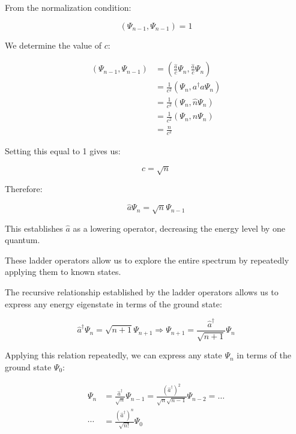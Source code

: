 \documentclass[italian]{HKNdocument}
\begin{document}
From the normalization condition:

\begin{equation*}
(\Psi_{n-1}, \Psi_{n-1}) = 1 \tag{5.32}
\end{equation*}

We determine the value of $c$:

\begin{align*}
(\Psi_{n-1}, \Psi_{n-1}) &= \left(\frac{\hat{a}}{c}\Psi_n, \frac{\hat{a}}{c}\Psi_n\right) \\
&= \frac{1}{c^2}(\Psi_n, a^\dagger a\Psi_n) \\
&= \frac{1}{c^2}(\Psi_n, \hat{n}\Psi_n) \tag{5.33} \\
&= \frac{1}{c^2}(\Psi_n, n\Psi_n) \\
&= \frac{n}{c^2}
\end{align*}

Setting this equal to 1 gives us:

\begin{equation*}
c = \sqrt{n} \tag{5.34}
\end{equation*}

Therefore:

\begin{equation*}
\hat{a}\Psi_n = \sqrt{n}\Psi_{n-1} \tag{5.35}
\end{equation*}

This establishes $\hat{a}$ as a lowering operator, decreasing the energy level by one quantum.

These ladder operators allow us to explore the entire spectrum by repeatedly applying them to known states.


The recursive relationship established by the ladder operators allows us to express any energy eigenstate in terms of the ground state:

\begin{equation*}
\hat{a}^\dagger\Psi_n = \sqrt{n+1}\Psi_{n+1} \Longrightarrow \Psi_{n+1} = \frac{\hat{a}^\dagger}{\sqrt{n+1}}\Psi_n \tag{5.36}
\end{equation*}

Applying this relation repeatedly, we can express any state $\Psi_n$ in terms of the ground state $\Psi_0$:

\begin{align*}
\Psi_n &= \frac{\hat{a}^\dagger}{\sqrt{n}}\Psi_{n-1} = \frac{(\hat{a}^\dagger)^2}{\sqrt{n}\sqrt{n-1}}\Psi_{n-2} = \ldots \tag{5.37} \\
\cdots &= \frac{(\hat{a}^\dagger)^n}{\sqrt{n!}}\Psi_0
\end{align*}
\end{document}
